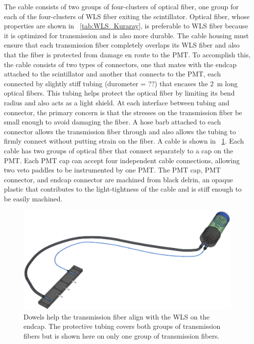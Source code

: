 The cable consists of two groups of four-clusters of optical fiber, one group for each of the four-clusters of WLS fiber exiting the scintillator.  Optical fiber, whose properties are shown in {\tab}~\ref{tab:WLS_Kuraray}, is preferable to WLS fiber because it is optimized for transmission and is also more durable.  The cable housing must ensure that each transmission fiber completely overlaps its WLS fiber and also that the fiber is protected from damage en route to the PMT.  To accomplish this, the cable consists of two types of connectors, one that mates with the endcap attached to the scintillator and another that connects to the PMT, each connected by slightly stiff tubing (durometer = ??) that encases the 2~m long optical fibers.  This tubing helps protect the optical fiber by limiting its bend radius and also acts as a light shield.  At each interface between tubing and connector, the primary concern is that the stresses on the transmission fiber be small enough to avoid damaging the fiber.  A hose barb attached to each connector allows the transmission fiber through and also allows the tubing to firmly connect without putting strain on the fiber.  A cable is shown in {\fig}~\ref{fig:paddleCable}.  Each cable has two groups of optical fiber that connect separately to a cap on the PMT.  Each PMT cap can accept four independent cable connections, allowing two veto paddles to be instrumented by one PMT.  The PMT cap, PMT connector, and endcap connector are machined from black delrin, an opaque plastic that contributes to the light-tightness of the cable and is stiff enough to be easily machined.  
\begin{figure}[!htbp]
\centering
\includegraphics[width=1.0\textwidth]{figures/cable.eps}
\caption{Dowels help the transmission fiber align with the WLS on the endcap.  The protective tubing covers both groups of transmission fibers but is shown here on only one group of transmission fibers.}
\label{fig:paddleCable}
\end{figure}

